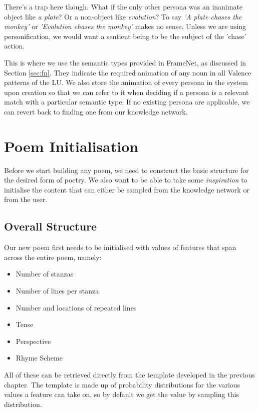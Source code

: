 There's a trap here though. What if the only other persona was an inanimate object like \textit{a plate}? Or a non-object like \textit{evolution}? To say \textit{'A plate chases the monkey'} or \textit{'Evolution chases the monkey'} makes no sense. Unless we are using personification, we would want a sentient being to be the subject of the 'chase' action.

This is where we use the semantic types provided in FrameNet, as discussed in Section \ref{sec:fn}. They indicate the required animation of any noun in all Valence patterns of the LU. We also store the animation of every persona in the system upon creation so that we can refer to it when deciding if a persona is a relevant match with a particular semantic type. If no existing persona are applicable, we can revert back to finding one from our knowledge network.


\section{Poem Initialisation}

Before we start building any poem, we need to construct the basic structure for the desired form of poetry. We also want to be able to take some \textit{inspiration} to initialise the content that can either be sampled from the knowledge network or from the user.

\subsection{Overall Structure}
\label{sec:overall-struct}
Our new poem first needs to be initialised with values of features that span across the entire poem, namely:
\begin{itemize}
\item{Number of stanzas}
\item{Number of lines per stanza}
\item{Number and locations of repeated lines}
\item{Tense}
\item{Perspective}
\item{Rhyme Scheme}
\end{itemize}

All of these can be retrieved directly from the template developed in the previous chapter. The template is made up of probability distributions for the various values a feature can take on, so by default we get the value by sampling this distribution. 

